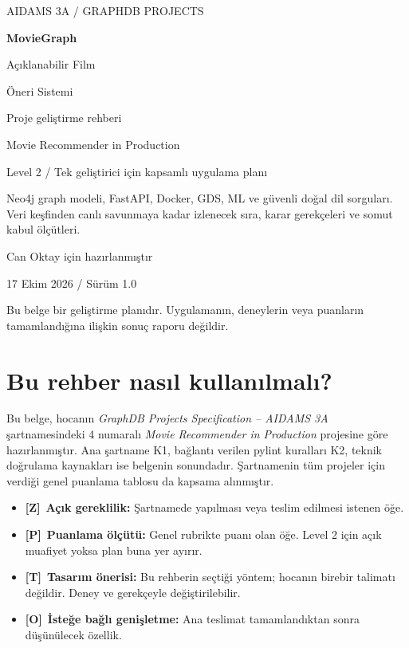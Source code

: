 \documentclass[11pt,a4paper]{article}
\newcommand{\must}{\textbf{[Z]}}
\newcommand{\score}{\textbf{[P]}}
\newcommand{\design}{\textbf{[T]}}
\newcommand{\optional}{\textbf{[O]}}
\begin{document}
\hypersetup{pageanchor=false}
\begin{titlepage}
\pagecolor{ink}\color{white}
\vspace*{1cm}
{\large AIDAMS 3A / GRAPHDB PROJECTS}\par
\vspace{1.7cm}
{\fontsize{43}{49}\selectfont\bfseries MovieGraph}\par
\vspace{0.45cm}
{\Huge Açıklanabilir Film\par Öneri Sistemi}\par
\vspace{0.8cm}
{\Large Proje geliştirme rehberi}\par
\vspace{0.5cm}
{\large Movie Recommender in Production\par Level 2 / Tek geliştirici için kapsamlı uygulama planı}
\vfill
\begin{minipage}{0.91\linewidth}
\large Neo4j graph modeli, FastAPI, Docker, GDS, ML ve güvenli doğal dil sorguları. Veri keşfinden canlı savunmaya kadar izlenecek sıra, karar gerekçeleri ve somut kabul ölçütleri.
\end{minipage}
\vfill
{\large Can Oktay için hazırlanmıştır}\par
{17 Ekim 2026 / Sürüm 1.0}\par
\vspace{0.5cm}
{\small Bu belge bir geliştirme planıdır. Uygulamanın, deneylerin veya puanların tamamlandığına ilişkin sonuç raporu değildir.}
\end{titlepage}
\hypersetup{pageanchor=true}
\nopagecolor\color{black}
\section*{Bu rehber nasıl kullanılmalı?}
Bu belge, hocanın \emph{GraphDB Projects Specification -- AIDAMS 3A} şartnamesindeki 4 numaralı \emph{Movie Recommender in Production} projesine göre hazırlanmıştır. Ana şartname K1, bağlantı verilen pylint kuralları K2, teknik doğrulama kaynakları ise belgenin sonundadır. Şartnamenin tüm projeler için verdiği genel puanlama tablosu da kapsama alınmıştır.

\begin{itemize}
\item \must\ \textbf{Açık gereklilik:} Şartnamede yapılması veya teslim edilmesi istenen öğe.
\item \score\ \textbf{Puanlama ölçütü:} Genel rubrikte puanı olan öğe. Level 2 için açık muafiyet yoksa plan buna yer ayırır.
\item \design\ \textbf{Tasarım önerisi:} Bu rehberin seçtiği yöntem; hocanın birebir talimatı değildir. Deney ve gerekçeyle değiştirilebilir.
\item \optional\ \textbf{İsteğe bağlı genişletme:} Ana teslimat tamamlandıktan sonra düşünülecek özellik.
\end{itemize}
\end{document}
